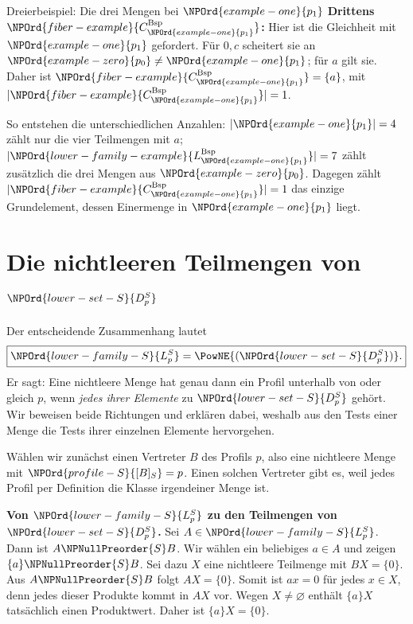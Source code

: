 \begin{NPReadingExample}{Dreierbeispiel: Die drei Mengen bei \(\NPOrd{example-one}{p_1}\)}
\textbf{Drittens \(\NPOrd{fiber-example}{C_{\NPOrd{example-one}{p_1}}^{\mathrm{Bsp}}}\):} Hier ist die Gleichheit mit \(\NPOrd{example-one}{p_1}\)
gefordert. Für \(0,c\) scheitert sie an \(\NPOrd{example-zero}{p_0}\ne \NPOrd{example-one}{p_1}\);
für \(a\) gilt sie. Daher ist \(\NPOrd{fiber-example}{C_{\NPOrd{example-one}{p_1}}^{\mathrm{Bsp}}}=\{a\}\), mit
\(|\NPOrd{fiber-example}{C_{\NPOrd{example-one}{p_1}}^{\mathrm{Bsp}}}|=1\).

So entstehen die unterschiedlichen Anzahlen: \(|\NPOrd{example-one}{p_1}|=4\) zählt
nur die vier Teilmengen mit \(a\); \(|\NPOrd{lower-family-example}{L_{\NPOrd{example-one}{p_1}}^{\mathrm{Bsp}}}|=7\) zählt zusätzlich
die drei Mengen aus \(\NPOrd{example-zero}{p_0}\). Dagegen zählt \(|\NPOrd{fiber-example}{C_{\NPOrd{example-one}{p_1}}^{\mathrm{Bsp}}}|=1\)
das einzige Grundelement, dessen Einermenge in \(\NPOrd{example-one}{p_1}\) liegt.
\end{NPReadingExample}

\section*{Die nichtleeren Teilmengen von \(\NPOrd{lower-set-S}{D_p^S}\)}

Der entscheidende Zusammenhang lautet
\[
 \boxed{\NPOrd{lower-family-S}{L_p^S}=\PowNE{(\NPOrd{lower-set-S}{D_p^S})}.}
\]
Er sagt: Eine nichtleere Menge hat genau dann ein Profil unterhalb
von oder gleich \(p\), wenn \emph{jedes ihrer Elemente} zu \(\NPOrd{lower-set-S}{D_p^S}\)
gehört. Wir beweisen beide Richtungen und erklären dabei, weshalb
aus den Tests einer Menge die Tests ihrer einzelnen Elemente hervorgehen.

Wählen wir zunächst einen Vertreter \(B\) des Profils \(p\), also
eine nichtleere Menge mit \(\NPOrd{profile-S}{[B]_S}=p\). Einen solchen Vertreter gibt es,
weil jedes Profil per Definition die Klasse irgendeiner Menge ist.

\medskip\noindent\textbf{Von \(\NPOrd{lower-family-S}{L_p^S}\) zu den Teilmengen von \(\NPOrd{lower-set-S}{D_p^S}\).}
Sei \(A\in \NPOrd{lower-family-S}{L_p^S}\). Dann ist \(A\NPNullPreorder{S} B\).
Wir wählen ein beliebiges \(a\in A\) und zeigen \(\{a\}\NPNullPreorder{S} B\).
Sei dazu \(X\) eine nichtleere Teilmenge mit \(BX=\{0\}\).
Aus \(A\NPNullPreorder{S} B\) folgt \(AX=\{0\}\). Somit ist \(ax=0\)
für jedes \(x\in X\), denn jedes dieser Produkte kommt in \(AX\) vor.
Wegen \(X\ne\varnothing\) enthält \(\{a\}X\) tatsächlich einen
Produktwert. Daher ist \(\{a\}X=\{0\}\).

